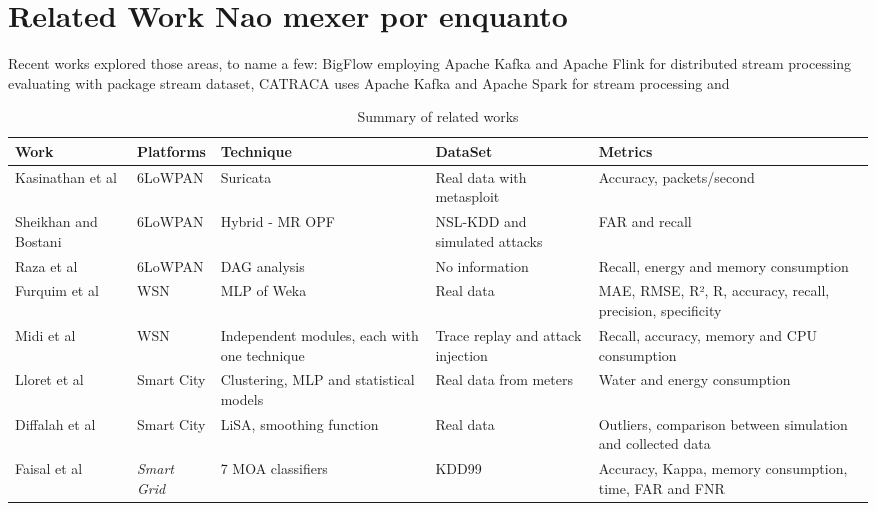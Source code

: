 
\section{Related Work {\color{red} Nao mexer por enquanto}}
\label{sec:related}

Recent works explored those areas, to name a few: BigFlow \cite{Viegas2019}
employing Apache Kafka and Apache Flink for distributed stream processing
evaluating with package stream dataset,
CATRACA \cite{Lopez2018,AndreoniLopez2019a} uses 
Apache Kafka and Apache Spark for stream processing and 

\cite{DaCosta2019a}



\begin{table*}[htb]
	\caption{Summary of related works}
	\centering
	\begin{scriptsize}
		\begin{tabularx}{\textwidth}{l|l|X|X|X}	
			Work & Platforms & Technique & DataSet & Metrics\\
			\hline
			\hline
			Kasinathan et al\cite{dos-6lowpan-iot} & 6LoWPAN & Suricata & Real data with metasploit & Accuracy, packets/second\\
			\hline
			Sheikhan and Bostani\cite{Hybrid-ids-arch-iot} & 6LoWPAN & Hybrid - MR OPF & NSL-KDD and simulated attacks & FAR and recall\\
			\hline
			Raza et al\cite{SVELTE} & 6LoWPAN & DAG analysis & No information & Recall, energy and memory consumption\\
			\hline
			Furquim et al\cite{Fault-tolerance-disaster} & WSN & MLP of Weka & Real data & MAE, RMSE, R², R, accuracy, recall, precision, specificity\\
			\hline
			Midi et al\cite{Kalis} & WSN & Independent modules, each with one technique & Trace replay and attack injection & Recall, accuracy, memory and CPU consumption\\
			\hline
			Lloret et al\cite{IoT-arch-smartmeter} & Smart City & Clustering, MLP and statistical models & Real data from meters & Water and energy consumption\\
			\hline
			Diffalah et al\cite{scalable-anomaly-detection-smart-city} & Smart City & LiSA, smoothing function & Real data & Outliers, comparison between simulation and collected data\\
			\hline
			Faisal et al\cite{DS-based-IDS-SmartGrid} & \textit{Smart Grid} & 7 MOA classifiers & KDD99 & Accuracy, Kappa, memory consumption, time, FAR and FNR \\
			\hline
		\end{tabularx}
		\label{tab:summary}
	\end{scriptsize}
\end{table*}


